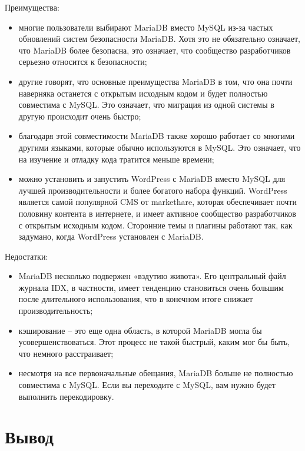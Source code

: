 \hspace{0cm} Преимущества:

\begin{itemize}
  \item многие пользователи выбирают MariaDB вместо MySQL из-за частых обновлений систем безопасности MariaDB. Хотя это не обязательно означает, что MariaDB более безопасна, это означает, что сообщество разработчиков серьезно относится к безопасности;
  \item другие говорят, что основные преимущества MariaDB в том, что она почти наверняка останется с открытым исходным кодом и будет полностью совместима с MySQL. Это означает, что миграция из одной системы в другую происходит очень быстро;
  \item благодаря этой совместимости MariaDB также хорошо работает со многими другими языками, которые обычно используются в MySQL. Это означает, что на изучение и отладку кода тратится меньше времени;
  \item можно установить и запустить WordPress с MariaDB вместо MySQL для лучшей производительности и более богатого набора функций. WordPress является самой популярной CMS от markethare, которая обеспечивает почти половину контента в интернете, и имеет активное сообщество разработчиков с открытым исходным кодом. Сторонние темы и плагины работают так, как задумано, когда WordPress установлен с MariaDB.
\end{itemize}

\hspace{0cm} Недостатки:

\begin{itemize}
  \item MariaDB несколько подвержен «вздутию живота». Его центральный файл журнала IDX, в частности, имеет тенденцию становиться очень большим после длительного использования, что в конечном итоге снижает производительность;
  \item кэширование – это еще одна область, в которой MariaDB могла бы усовершенствоваться. Этот процесс не такой быстрый, каким мог бы быть, что немного расстраивает;
  \item несмотря на все первоначальные обещания, MariaDB больше не полностью совместима с MySQL. Если вы переходите с MySQL, вам нужно будет выполнить перекодировку.
\end{itemize}

\newpage

\section{Вывод}

